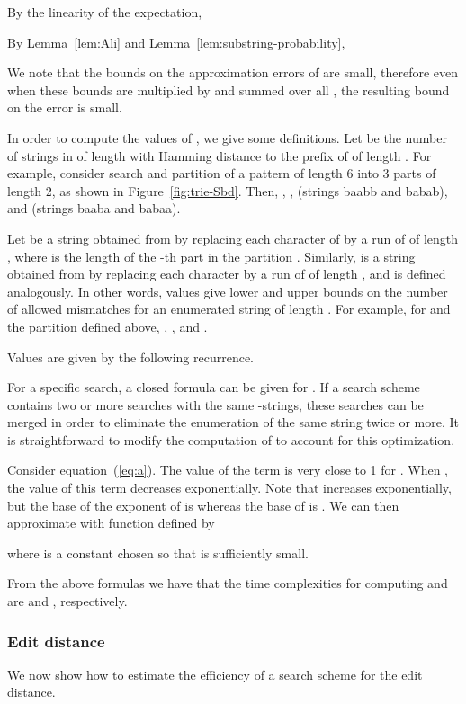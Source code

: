 \documentclass[12pt]{article}
\begin{document}
By the linearity of the expectation,

By Lemma~\ref{lem:Ali} and Lemma~\ref{lem:substring-probability},

We note that the bounds on the approximation errors of 
are small, therefore even when these bounds are multiplied by 
and summed over all , the resulting bound on the error is small.

In order to compute the values of , we give some definitions.
Let  be the number of strings in 
of length  with Hamming distance  to the prefix of 
of length .
For example, consider search  and partition of 
a pattern of length 6 into 3 parts of length 2,
as shown in Figure~\ref{fig:trie-Sbd}.
Then, , ,
 (strings baabb and babab),
and  (strings baaba and babaa).

Let  be a string obtained from  by replacing each
character  of  by a run of  of length
,
where  is the length of the -th part in the partition
.
Similarly,  is a string obtained from
 by replacing each character   by a run of  of length
, and  is defined analogously.
In other words, values 
give lower and upper bounds on the number of allowed mismatches for an
enumerated string of length .
For example, for  and the partition  defined above,
, ,
and .

Values  are given by the following recurrence.

For a specific search, a closed formula can be given for .
If a search scheme  contains two or more searches with the same
-strings, these searches can be merged in order to eliminate the
enumeration of the same string twice or more.
It is straightforward to modify the computation of  to account for this optimization.


Consider equation~(\ref{eq:a}).
The value of the term  is very close to 1
for .
When , the value of this term decreases
exponentially.
Note that  increases exponentially, but the base of the exponent
of  is  whereas the base of  is
.
We can then approximate  with function
 defined by

where  is a constant chosen so that 
is sufficiently small.

From the above formulas we have that the time complexities for
computing  and
 are
 and , respectively.


\subsubsection{Edit distance}\label{sec:estimation-edit}
We now show how to estimate the efficiency of a search scheme for the edit distance.
\end{document}
